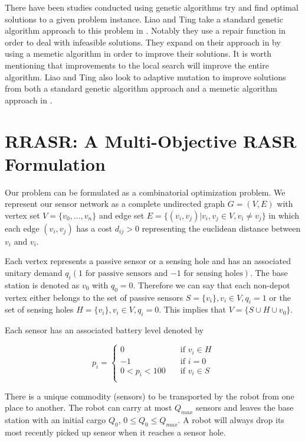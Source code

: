 \documentclass[conference]{IEEEtran}
\begin{document}
There have been studies conducted using genetic algorithms try and find optimal solutions to a given problem instance. Liao and Ting take a standard genetic algorithm approach to this problem in \cite{liao2010evolutionary}. Notably they use a repair function in order to deal with infeasible solutions. They expand on their approach in \cite{ting2013selective} by using a memetic algorithm in order to improve their solutions. It is worth mentioning that improvements to the local search will improve the entire algorithm. Liao and Ting also look to adaptive mutation to improve solutions from both a standard genetic algorithm approach and a memetic algorithm approach in \cite{liao2012evolutionary}.

\section{RRASR: A Multi-Objective RASR Formulation}
\label{sec:MOOProblem}

Our problem can be formulated as a combinatorial optimization problem. We represent our sensor network as a complete undirected graph $G=(V, E)$ with vertex set $V=\{v_0,...,v_n \}$ and edge set $E=\{(v_i,v_j) | v_i,v_j \in  V, v_i \neq v_j\}$ in which each edge $(v_i,v_j)$ has a cost $d_{ij}>0$ representing the euclidean distance between $v_i$ and $v_i$.

Each vertex represents a passive sensor or a sensing hole and has an associated unitary demand $q_i(1 \text{ for passive sensors and } {-1} \text{ for sensing holes})$. The base station is denoted as $v_0$ with $q_0=0$. Therefore we can say that each non-depot vertex either belongs to the set of passive sensors $S=\{v_i\},v_i \in V, q_i=1$ or the set of sensing holes $H=\{v_i\},v_i \in V, q_i=0$. This implies that $V = \{ S \cup H \cup v_0\}$.

Each sensor has an associated battery level denoted by 

\[ p_i = \left\{ \begin{array}{ll}
0 & \quad \text{if $v_i \in H$} \\
{-1} & \quad \text{if $i = 0$} \\
0 < p_i < 100 & \quad \text{if $v_i \in S$} \\
\end{array} \right. \]

There is a unique commodity (sensors) to be transported by the robot from one place to another. The robot can carry at most $Q_{max}$ sensors and leaves the base station with an initial cargo $Q_0$, $0 \leq Q_0 \leq Q_{max}$. A robot will always drop its most recently picked up sensor when it reaches a sensor hole.
\end{document}
